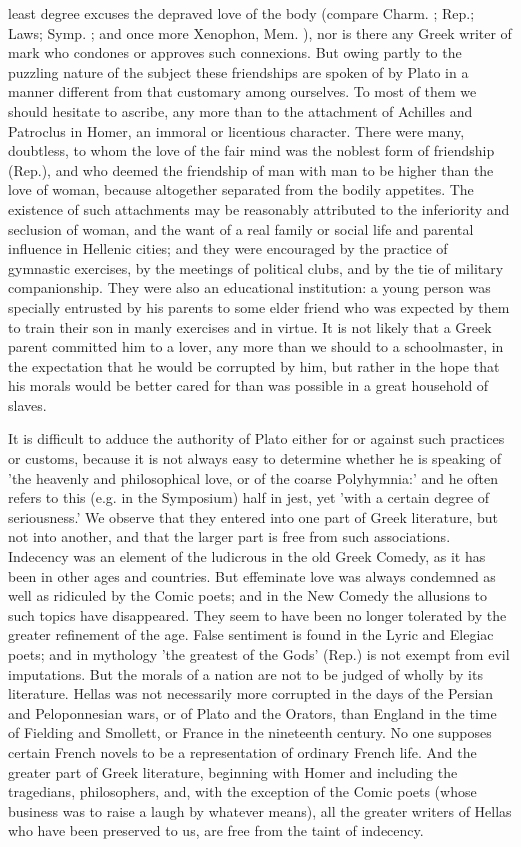 \documentclass[11pt,letter]{article}
\begin{document}
least degree excuses the depraved love of the body (compare Charm. ; Rep.; Laws; Symp. ; and once more Xenophon, Mem. ), nor is there any Greek writer of mark who condones or approves such connexions. But owing partly to the puzzling nature of the subject these friendships are spoken of by Plato in a manner different from that customary among ourselves. To most of them we should hesitate to ascribe, any more than to the attachment of Achilles and Patroclus in Homer, an immoral or licentious character. There were many, doubtless, to whom the love of the fair mind was the noblest form of friendship (Rep.), and who deemed the friendship of man with man to be higher than the love of woman, because altogether separated from the bodily appetites. The existence of such attachments may be reasonably attributed to the inferiority and seclusion of woman, and the want of a real family or social life and parental influence in Hellenic cities; and they were encouraged by the practice of gymnastic exercises, by the meetings of political clubs, and by the tie of military companionship. They were also an educational institution: a young person was specially entrusted by his parents to some elder friend who was expected by them to train their son in manly exercises and in virtue. It is not likely that a Greek parent committed him to a lover, any more than we should to a schoolmaster, in the expectation that he would be corrupted by him, but rather in the hope that his morals would be better cared for than was possible in a great household of slaves.

\par  It is difficult to adduce the authority of Plato either for or against such practices or customs, because it is not always easy to determine whether he is speaking of 'the heavenly and philosophical love, or of the coarse Polyhymnia:' and he often refers to this (e.g. in the Symposium) half in jest, yet 'with a certain degree of seriousness.' We observe that they entered into one part of Greek literature, but not into another, and that the larger part is free from such associations. Indecency was an element of the ludicrous in the old Greek Comedy, as it has been in other ages and countries. But effeminate love was always condemned as well as ridiculed by the Comic poets; and in the New Comedy the allusions to such topics have disappeared. They seem to have been no longer tolerated by the greater refinement of the age. False sentiment is found in the Lyric and Elegiac poets; and in mythology 'the greatest of the Gods' (Rep.) is not exempt from evil imputations. But the morals of a nation are not to be judged of wholly by its literature. Hellas was not necessarily more corrupted in the days of the Persian and Peloponnesian wars, or of Plato and the Orators, than England in the time of Fielding and Smollett, or France in the nineteenth century. No one supposes certain French novels to be a representation of ordinary French life. And the greater part of Greek literature, beginning with Homer and including the tragedians, philosophers, and, with the exception of the Comic poets (whose business was to raise a laugh by whatever means), all the greater writers of Hellas who have been preserved to us, are free from the taint of indecency.
\end{document}
